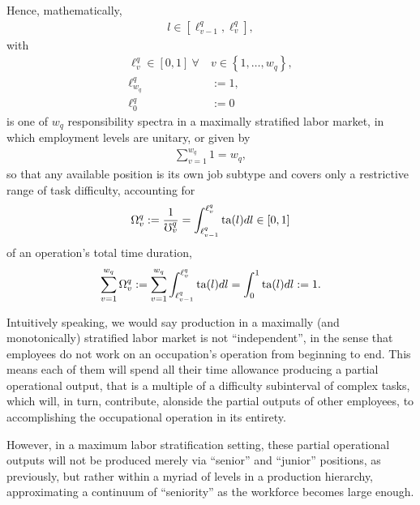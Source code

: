\documentclass[hidelinks, nonatbib]{elsarticle}
\begin{document}
\begin{definition}
    \label{mmls_def}
    Hence, mathematically,
    \begin{gather}
    l \in \left[
    \ell_{v-1}^{q}
    ,
    \ell_{v}^{q}
    \right]
    ,
    \end{gather}
    with
    \begin{align}
    \ell_{v}^{q} \in [0,1]
    \
    \forall
    \
    &v \in 
    \left\{
        1, \dots, w_q
    \right\}
    ,
    \\
    \ell_{w_q}^{q}&:= 1
    ,
    \\
    \ell_{0}^{q} &:= 0
    \end{align}
    is one of $w_q$ responsibility spectra in a maximally stratified labor market, in which employment levels are unitary, or given by
    \begin{gather}
    \sum_{v=1}^{w_q}
    1
    =
    w_q
    ,
    \end{gather}
    so that any available position is its own job subtype and covers only a restrictive range of task difficulty, accounting for
    \begin{gather}
    \Omega_{v}^{q}
    := 
    \frac{1}{\mho_{v}^{q}}
    = 
    \int_{
        \ell_{v-1}^{q}
    }^{
        \ell_{v}^{q}
    }
    \text{ta}(l)dl
    \in [0,1]
    \end{gather}
    of an operation's total time duration,
    \begin{gather}
    \sum_{v=1}^{w_q}
    \Omega_{v}^{q} 
    := 
    \sum_{v=1}^{w_q}
    \int_{
        \ell_{v-1}^{q}
    }^{
        \ell_{v}^{q}
    }
    \text{ta}(l)dl
    =
    \int_{0}^{1}
    \text{ta}(l)dl
    :=
    1
    .
    \end{gather}
    
    Intuitively speaking, we would say production in a maximally (and monotonically) stratified labor market is not ``independent'', in the sense that employees do not work on an occupation's operation from beginning to end. This means each of them will spend all their time allowance producing a partial operational output, that is a multiple of a difficulty subinterval of complex tasks, which will, in turn, contribute, alonside the partial outputs of other employees, to accomplishing the occupational operation in its entirety.
    
    However, in a maximum labor stratification setting, these partial operational outputs will not be produced merely via ``senior'' and ``junior'' positions, as previously, but rather within a myriad of levels in a production hierarchy, approximating a continuum of ``seniority'' as the workforce becomes large enough.
    

\end{definition}
\end{document}
